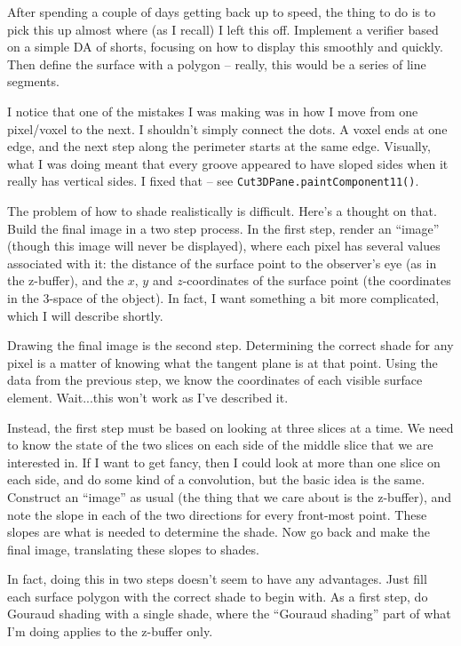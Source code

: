 \documentclass[titlepage,oneside,10pt]{article}
\begin{document}
After spending a couple of days getting back up to speed, the thing to
do is to pick this up almost where (as I recall) I left this
off. Implement a verifier based on a simple DA of shorts, focusing
on how to display this smoothly and quickly. Then define the surface
with a polygon -- really, this would be a series of line segments.

I notice that one of the mistakes I was making was in how I move from
one pixel/voxel to the next. I shouldn't simply connect the dots. A
voxel ends at one edge, and the next step along the perimeter starts
at the same edge. Visually, what I was doing meant that every groove
appeared to have sloped sides when it really has vertical sides. I
fixed that -- see {\tt Cut3DPane.paintComponent11()}.

The problem of how to shade realistically is difficult. Here's a
thought on that. Build the final image in a two step process. In the
first step, render an ``image'' (though this image will never be
displayed), where each pixel has several values associated with it:
the distance of the surface point to the observer's eye (as in the
z-buffer), and the $x$, $y$ and $z$-coordinates of the surface point
(the coordinates in the 3-space of the object). In fact, I want
something a bit more complicated, which I will describe
shortly. 

Drawing the final image is the second step. Determining the correct
shade for any pixel is a matter of knowing what the tangent plane is
at that point. Using the data from the previous step, we know the
coordinates of each visible surface element. Wait...this won't work as
I've described it.

Instead, the first step must be based on looking at three slices at a
time. We need to know the state of the two slices on each side of the
middle slice that we are interested in. If I want to get fancy, then I
could look at more than one slice on each side, and do some kind of a
convolution, but the basic idea is the same. Construct an ``image'' as
usual (the thing that we care about is the z-buffer), and note the
slope in each of the two directions for every front-most point. These
slopes are what is needed to determine the shade. Now go back and make
the final image, translating these slopes to shades.

In fact, doing this in two steps doesn't seem to have any
advantages. Just fill each surface polygon with the correct shade to
begin with. As a first step, do Gouraud shading with a single shade,
where the ``Gouraud shading'' part of what I'm doing applies to the
z-buffer only. 
\end{document}
